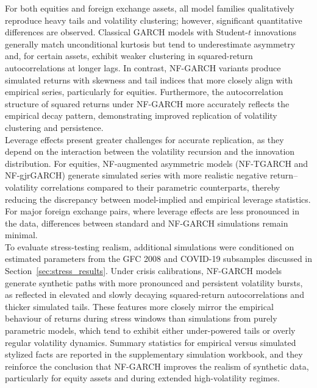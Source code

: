 \documentclass[oneside,12pt]{CUEDthesisPSnPDF}
\begin{document}
For both equities and foreign exchange assets, all model families qualitatively reproduce heavy tails and volatility clustering; however, significant quantitative differences are observed. Classical GARCH models with Student-$t$ innovations generally match unconditional kurtosis but tend to underestimate asymmetry and, for certain assets, exhibit weaker clustering in squared-return autocorrelations at longer lags. In contrast, NF-GARCH variants produce simulated returns with skewness and tail indices that more closely align with empirical series, particularly for equities. Furthermore, the autocorrelation structure of squared returns under NF-GARCH more accurately reflects the empirical decay pattern, demonstrating improved replication of volatility clustering and persistence.\\

Leverage effects present greater challenges for accurate replication, as they depend on the interaction between the volatility recursion and the innovation distribution. For equities, NF-augmented asymmetric models (NF-TGARCH and NF-gjrGARCH) generate simulated series with more realistic negative return–volatility correlations compared to their parametric counterparts, thereby reducing the discrepancy between model-implied and empirical leverage statistics. For major foreign exchange pairs, where leverage effects are less pronounced in the data, differences between standard and NF-GARCH simulations remain minimal.\\

To evaluate stress-testing realism, additional simulations were conditioned on estimated parameters from the GFC 2008 and COVID-19 subsamples discussed in Section~\ref{sec:stress_results}. Under crisis calibrations, NF-GARCH models generate synthetic paths with more pronounced and persistent volatility bursts, as reflected in elevated and slowly decaying squared-return autocorrelations and thicker simulated tails. These features more closely mirror the empirical behaviour of returns during stress windows than simulations from purely parametric models, which tend to exhibit either under-powered tails or overly regular volatility dynamics. Summary statistics for empirical versus simulated stylized facts are reported in the supplementary simulation workbook, and they reinforce the conclusion that NF-GARCH improves the realism of synthetic data, particularly for equity assets and during extended high-volatility regimes.\\

\end{document}
